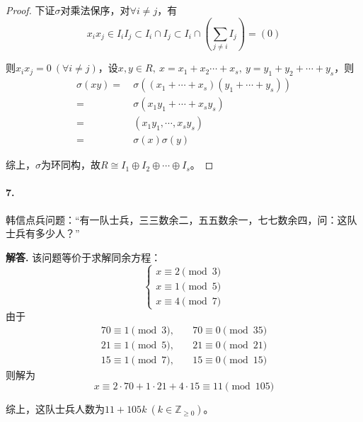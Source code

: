\documentclass[12pt, a4paper, oneside]{ctexart}
\newenvironment{solution}{\par\noindent\textbf{解答. }}{\bigskip\par}
\begin{document}
\begin{proof}
    下证$\sigma$对乘法保序，对$\forall i\neq j$，有
    \begin{equation*}
        x_ix_j\in I_iI_j\subset I_i\cap I_j\subset I_i\cap (\sum_{j\neq i}I_j)=(0)
    \end{equation*}

    则$x_ix_j = 0\ (\forall i\neq j)$，设$x,y\in R,\ x = x_1+x_2\cdots+x_s,\ y = y_1+y_2+\cdots+y_s$，则
    \begin{equation*}
        \begin{aligned}
            \sigma(xy) =&\ \sigma((x_1+\cdots+x_s)(y_1+\cdots+y_s))\\
            =&\ \sigma(x_1y_1+\cdots+x_sy_s)\\
            =&\ (x_1y_1,\cdots,x_sy_s)\\
            =&\ \sigma(x)\sigma(y)
        \end{aligned}
    \end{equation*}

    综上，$\sigma$为环同构，故$R\cong I_1\oplus I_2\oplus\cdots\oplus I_s$。
\end{proof}
\paragraph{7.}韩信点兵问题：“有一队士兵，三三数余二，五五数余一，七七数余四，问：这队士兵有多少人？”
\begin{solution}
    该问题等价于求解同余方程：
    \begin{equation*}
        \begin{cases}
            x\equiv 2\pmod 3\\
            x\equiv 1\pmod 5\\
            x\equiv 4\pmod 7
        \end{cases}
    \end{equation*}
    由于
    \begin{equation*}
        \begin{aligned}
            70\equiv 1\pmod 3,&\quad 70\equiv 0\pmod{35}\\
            21\equiv 1\pmod 5,&\quad 21\equiv 0\pmod{21}\\
            15\equiv 1\pmod 7,&\quad 15\equiv 0\pmod{15}
        \end{aligned}
    \end{equation*}
    则解为
    \begin{equation*}
        x\equiv 2\cdot 70 + 1\cdot 21 + 4\cdot 15\equiv 11\pmod{105}
    \end{equation*}

    综上，这队士兵人数为$11+105k\ (k\in \mathbb{Z}_{\geqslant 0})$。
\end{solution}
\end{document}
